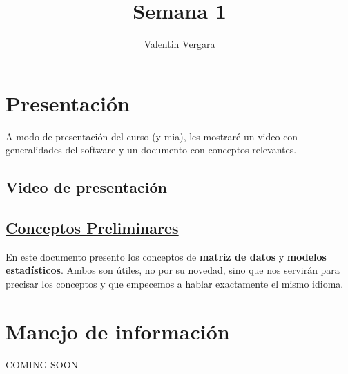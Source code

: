 \documentclass[11pt]{article}
\author{Valentin Vergara}
\date{}
\title{Semana 1}
\begin{document}
\maketitle

\section*{Presentación}
\label{sec:orgdfbcfda}
A modo de presentación del curso (y mia), les mostraré un video con generalidades del software y un documento con conceptos relevantes.

\subsection*{Video de presentación}
\label{sec:orge475aa0}

\subsection*{\href{docs/week1-1.pdf}{Conceptos Preliminares}}
\label{sec:org75945ee}
En este documento presento los conceptos de \textbf{matriz de datos} y \textbf{modelos estadísticos}. Ambos son útiles, no por su novedad, sino que nos servirán para precisar los conceptos y que empecemos a hablar exactamente el mismo idioma.

\section*{Manejo de información}
\label{sec:org3c7d33a}
COMING SOON
\end{document}

